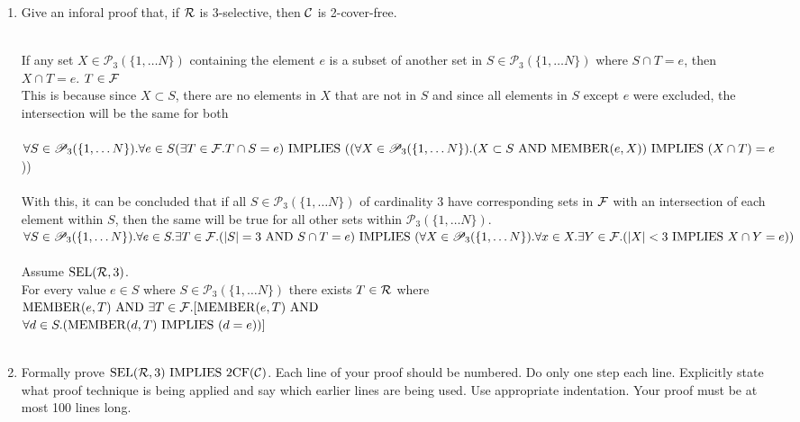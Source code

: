 \documentclass[11pt]{article}
\newcommand{\Implies}{\mbox{ IMPLIES }}
\newcommand{\And}{\mbox{ AND }}
\newcommand{\Subsets}[1]{\mathscr{P}_{#1}(\{1,\ldots N\})}
\newcounter{ind}
\begin{document}
\begin{enumerate}
\item
\begin{question}
Give an inforal proof that, if $\cal R$ is 3-selective, then $\cal C$ is 2-cover-free.\\\\
\end{question}

If any set $X\in\Subsets{3}$ containing the element $e$ is a subset of another set in $S\in\Subsets{3}$ where
$S\cap T=e$, then $X\cap T = e$. $T\in{\cal F}$\\
This is because since $X\subset S$, there are no elements in $X$ that are not in $S$ and since all elements in $S$ except $e$ were excluded, the intersection will be the same for both\\\\
$\forall S\in\Subsets{3}.\forall e\in S(\exists T\in {\cal F}.T\cap S = e) \Implies\\
((\forall X\in \Subsets{3}.(X \subset S\And {\rm MEMBER}(e,X)) \Implies (X\cap T) = e$))\\\\

With this, it can be concluded that if all $S\in\Subsets{3}$ of cardinality 3 have corresponding sets in ${\cal F}$ with an intersection of each element within $S$, then the same will be true for all other sets within $\Subsets{3}$. \\
$\forall S\in \Subsets{3}.\forall e\in S.\exists T\in {\cal F}.(|S| = 3 \And S\cap T=e) \Implies \\
(\forall X\in \Subsets{3}.\forall x\in X.\exists Y\in {\cal F}.(|X|< 3 \Implies X\cap Y = e))$\\\\

\null\quad Assume ${\rm SEL}({\cal R}, 3)$.\\
\null\quad For every value $e\in S$ where $S\in \Subsets{3}$ there exists $T\in {\cal R}$ where \\
\null\quad ${\rm MEMBER}(e,T)\And \exists T \in {\cal F}. [{\rm MEMBER}(e,T) \And$\\
\null\quad $\forall d \in S. ({\rm MEMBER}(d,T) \Implies (d=e))]$\\\\


\item
\begin{question}
Formally prove  ${\rm SEL}({\cal R},3) \Implies {\rm 2CF}({\cal C})$.
Each line of your proof should be numbered.
Do only one step each line.
Explicitly state what proof technique is being
applied and say which earlier lines are being used.
Use appropriate indentation. Your proof must be at most 100 lines long.\\\\
\end{question}

\begin{solution}

\end{solution}
\end{enumerate}
\end{document}
